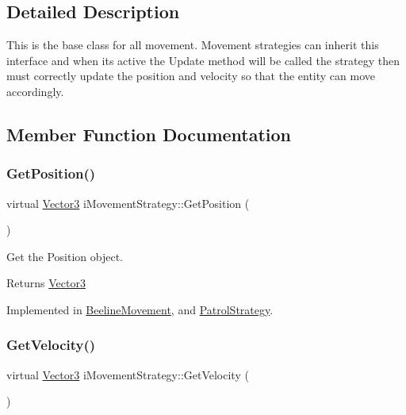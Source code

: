 \subsection{Detailed Description}
This is the base class for all movement. Movement strategies can inherit this interface and when it\textquotesingle{}s active the Update method will be called the strategy then must correctly update the position and velocity so that the entity can move accordingly. 

\subsection{Member Function Documentation}
\mbox{\label{classiMovementStrategy_aa9f5a07461c654a7497775696d20e990}} 
\subsubsection{\texorpdfstring{Get\+Position()}{GetPosition()}}
{\footnotesize\ttfamily virtual \hyperlink{classVector3}{Vector3} i\+Movement\+Strategy\+::\+Get\+Position (\begin{DoxyParamCaption}{ }\end{DoxyParamCaption})\hspace{0.3cm}{\ttfamily [pure virtual]}}



Get the Position object. 

\begin{DoxyReturn}{Returns}
\hyperlink{classVector3}{Vector3} 
\end{DoxyReturn}


Implemented in \hyperlink{classBeelineMovement_abfe070233bcdba668cd6f445b149f310}{Beeline\+Movement}, and \hyperlink{classPatrolStrategy_a6feda4df5165aaae0cc7b82aed578c79}{Patrol\+Strategy}.

\mbox{\label{classiMovementStrategy_a92f20c8ebf7c4f7dde5743528b8e45b7}} 
\subsubsection{\texorpdfstring{Get\+Velocity()}{GetVelocity()}}
{\footnotesize\ttfamily virtual \hyperlink{classVector3}{Vector3} i\+Movement\+Strategy\+::\+Get\+Velocity (\begin{DoxyParamCaption}{ }\end{DoxyParamCaption})\hspace{0.3cm}{\ttfamily [pure virtual]}}



